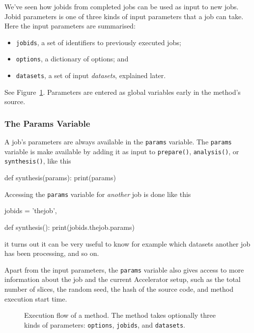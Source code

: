 \documentclass[a4paper]{article}
\begin{document}
We've seen how jobids from completed jobs can be used as input to new
jobs.  Jobid parameters is one of three kinds of input parameters that
a job can take.  Here the input parameters are summarised:
\begin{itemize}
  \item[] \texttt{jobids}, a set of identifiers to previously executed jobs;
  \item[] \texttt{options}, a dictionary of options; and
  \item[] \texttt{datasets}, a set of input \textsl{datasets}, explained later.
\end{itemize}
See Figure~\ref{fig:execflow}.  Parameters are entered as global
variables early in the method's source.



\subsubsection{The Params Variable}
A job's parameters are always available in the \texttt{params}
variable.  The \texttt{params} variable is make available by adding it
as input to \texttt{prepare()}, \texttt{analysis()}, or
\texttt{synthesis()}, like this
\begin{python}
  def synthesis(params):
    print(params)
\end{python}
Accessing the \texttt{params} variable for \textsl{another} job is
done like this
\begin{python}
  jobids = {'thejob',}

  def synthesis():
    print(jobids.thejob.params)
\end{python}
it turns out it can be very useful to know for example which datasets
another job has been processing, and so on.

Apart from the input parameters, the \texttt{params} variable also
gives access to more information about the job and the current
Accelerator setup, such as the total number of slices, the random
seed, the hash of the source code, and method execution start time.


\begin{figure}[h!]
  \begin{center}
    
    \caption{Execution flow of a method.  The method takes optionally
      three kinds of parameters: \texttt{options}, \texttt{jobids},
      and \texttt{datasets}.}
    \label{fig:execflow}
  \end{center}
\end{figure}
\end{document}
